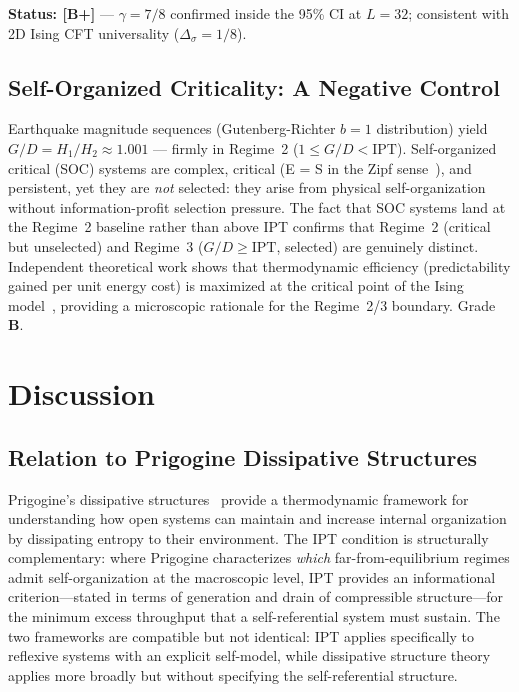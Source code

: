 \documentclass[11pt,twocolumn]{article}
\newcommand{\CatB}{\textbf{B}}
\theoremstyle{remark}
\begin{document}
\noindent\textbf{Status: [B+]} --- $\gamma = 7/8$ confirmed inside the 95\% CI at $L = 32$; consistent with 2D Ising CFT universality ($\Delta_\sigma = 1/8$).

\subsection{Self-Organized Criticality: A Negative Control}
\label{sec:realworld:soc}

Earthquake magnitude sequences (Gutenberg-Richter $b=1$ distribution) yield $G/D = H_1/H_2 \approx 1.001$ --- firmly in Regime~2 ($1 \leq G/D < \text{IPT}$). Self-organized critical (SOC) systems are complex, critical (E = S in the Zipf sense~\cite{Schwab2013}), and persistent, yet they are \emph{not} selected: they arise from physical self-organization without information-profit selection pressure. The fact that SOC systems land at the Regime~2 baseline rather than above IPT confirms that Regime~2 (critical but unselected) and Regime~3 ($G/D \geq \text{IPT}$, selected) are genuinely distinct. Independent theoretical work shows that thermodynamic efficiency (predictability gained per unit energy cost) is maximized at the critical point of the Ising model~\cite{ChenProkopenko2024}, providing a microscopic rationale for the Regime~2/3 boundary. Grade~$\CatB$.

\section{Discussion}
\label{sec:discussion}

\subsection{Relation to Prigogine Dissipative Structures}
\label{sec:discussion:prigogine}

Prigogine's dissipative structures~\cite{Nicolis1977} provide
a thermodynamic framework for understanding how open systems can
maintain and increase internal organization by dissipating entropy
to their environment. The IPT condition is structurally complementary:
where Prigogine characterizes \emph{which} far-from-equilibrium
regimes admit self-organization at the macroscopic level, IPT
provides an informational criterion---stated in terms of generation
and drain of compressible structure---for the minimum excess throughput
that a self-referential system must sustain. The two frameworks
are compatible but not identical: IPT applies specifically to
reflexive systems with an explicit self-model, while dissipative
structure theory applies more broadly but without specifying the
self-referential structure.
\end{document}
